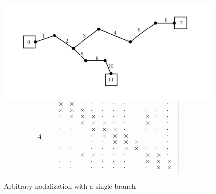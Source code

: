 \documentclass[11pt,letterpaper,titlepage]{article}
\begin{document}
\begin{figure}[H]
\centering
\includegraphics[width=0.7\linewidth]{Latexdraw/CrazyNodes}
\begin{equation*}
A=
\begin{bmatrix}
\times & \times & \cdot  & \cdot  & \cdot  & \cdot  & \cdot  & \cdot  & \cdot  & \cdot  & \cdot  \\
\times & \times & \times & \cdot  & \cdot  & \cdot  & \cdot  & \cdot  & \cdot  & \cdot  & \cdot  \\
\cdot  & \times & \times & \times & \cdot  & \cdot  & \cdot  & \cdot  & \times & \cdot  & \cdot  \\
\cdot  & \cdot  & \times & \times & \times & \cdot  & \cdot  & \cdot  & \times & \cdot  & \cdot  \\
\cdot  & \cdot  & \cdot  & \times & \times & \times & \cdot  & \cdot  & \cdot  & \cdot  & \cdot  \\
\cdot  & \cdot  & \cdot  & \cdot  & \times & \times & \times & \cdot  & \cdot  & \cdot  & \cdot  \\
\cdot  & \cdot  & \cdot  & \cdot  & \cdot  & \times & \times & \times & \cdot  & \cdot  & \cdot  \\
\cdot  & \cdot  & \cdot  & \cdot  & \cdot  & \cdot  & \times & \times & \cdot  & \cdot  & \cdot  \\
\cdot  & \cdot  & \times & \times & \cdot  & \cdot  & \cdot  & \cdot  & \times & \times & \cdot  \\
\cdot  & \cdot  & \cdot  & \cdot  & \cdot  & \cdot  & \cdot  & \cdot  & \times & \times & \times \\
\cdot  & \cdot  & \cdot  & \cdot  & \cdot  & \cdot  & \cdot  & \cdot  & \cdot  & \times & \times \\
\end{bmatrix}
\end{equation*} 
\caption[CrazyNodes]{Arbitrary nodalization with a single branch.}
\label{fig:CrazyNodes}
\end{figure}
          
\end{document}
